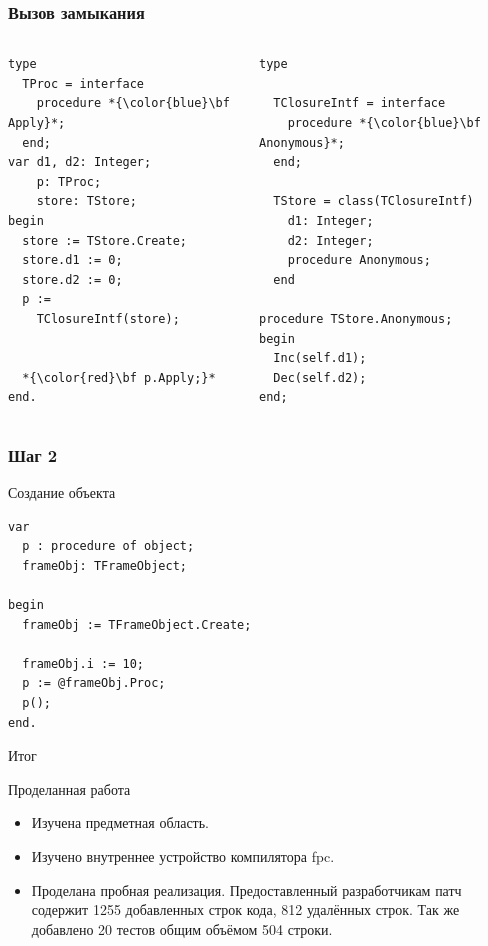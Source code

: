 \documentclass[roman,12pt]{beamer}
\begin{document}
\begin{frame}[fragile]
  \frametitle{Вызов замыкания}
  \begin{columns}[c]
    \column{2.2in}
     \begin{lstlisting}[escapechar=*,basicstyle=\scriptsize]
type 
  TProc = interface
    procedure *{\color{blue}\bf Apply}*;
  end;
var d1, d2: Integer;
    p: TProc;
    store: TStore;
begin
  store := TStore.Create;
  store.d1 := 0;
  store.d2 := 0;
  p :=
    TClosureIntf(store);
 

  *{\color{red}\bf p.Apply;}*
end.

     \end{lstlisting}
   \column{2.2in}
     \begin{lstlisting}[escapechar=*,basicstyle=\scriptsize]  
type

  TClosureIntf = interface
    procedure *{\color{blue}\bf Anonymous}*;
  end;

  TStore = class(TClosureIntf)
    d1: Integer;
    d2: Integer;
    procedure Anonymous;
  end
  
procedure TStore.Anonymous;
begin
  Inc(self.d1);
  Dec(self.d2);
end;

     \end{lstlisting}

  \end{columns}
\end{frame}


\begin{frame}[fragile]
  \frametitle{Шаг 2}
 \begin{block}{Создание объекта}
   \begin{lstlisting}
var
  p : procedure of object;
  frameObj: TFrameObject;

begin
  frameObj := TFrameObject.Create;

  frameObj.i := 10;
  p := @frameObj.Proc;
  p();
end.
   \end{lstlisting}
 \end{block} 
\end{frame}

\begin{frame}{Итог}
   \begin{block}{Проделанная работа}
     \begin{itemize}
     \item Изучена предметная область.
     \item Изучено внутреннее устройство компилятора fpc.
     \item Проделана пробная реализация. Предоставленный разработчикам
       патч содержит 1255 добавленных строк кода, 812 удалённых строк.
Так же добавлено 20 тестов общим объёмом 504 строки.
     \end{itemize}
   \end{block} 
\end{frame}
\end{document}
